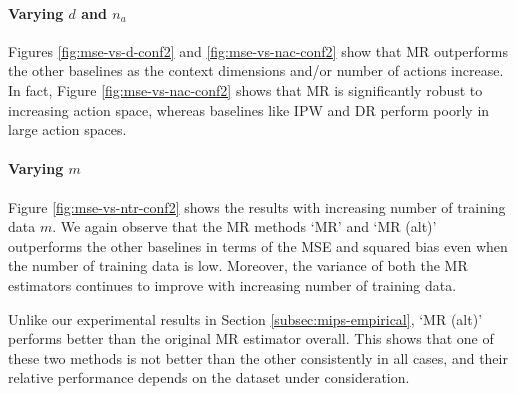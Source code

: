 \paragraph{Varying $d$ and $n_a$}
Figures \ref{fig:mse-vs-d-conf2} and \ref{fig:mse-vs-nac-conf2} show that MR outperforms the other baselines as the context dimensions and/or number of actions increase. In fact, Figure \ref{fig:mse-vs-nac-conf2} shows that MR is significantly robust to increasing action space, whereas baselines like IPW and DR perform poorly in large action spaces.

\paragraph{Varying $m$}
Figure \ref{fig:mse-vs-ntr-conf2} shows the results with increasing number of training data $m$. We again observe that the MR methods `MR' and `MR (alt)' outperforms the other baselines in terms of the MSE and squared bias even when the number of training data is low. Moreover, the variance of both the MR estimators continues to improve with increasing number of training data.

Unlike our experimental results in Section \ref{subsec:mips-empirical}, `MR (alt)' performs better than the original MR estimator overall. This shows that one of these two methods is not better than the other consistently in all cases, and their relative performance depends on the dataset under consideration. 

